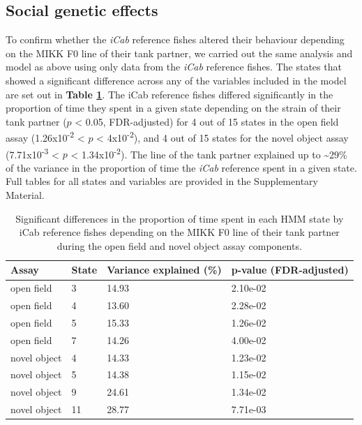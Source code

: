 \documentclass[
]{book}
\begin{document}
\hypertarget{social-genetic-effects-2}{%
\subsection{Social genetic effects}\label{social-genetic-effects-2}}

To confirm whether the \emph{\textcolor{iCab_424B4D}{iCab}} reference fishes altered their behaviour depending on the MIKK F0 line of their tank partner, we carried out the same analysis and model as above using only data from the \emph{\textcolor{iCab_424B4D}{iCab}} reference fishes. The states that showed a significant difference across any of the variables included in the model are set out in \textbf{Table \ref{tab:mikk-sge-F0}}. The iCab reference fishes differed significantly in the proportion of time they spent in a given state depending on the strain of their tank partner (\(p\) \textless{} 0.05, FDR-adjusted) for 4 out of 15 states in the open field assay (1.26x10\textsuperscript{-2} \textless{} \(p\) \textless{} 4x10\textsuperscript{-2}), and 4 out of 15 states for the novel object assay (7.71x10\textsuperscript{-3} \textless{} \(p\) \textless{} 1.34x10\textsuperscript{-2}). The line of the tank partner explained up to \textasciitilde29\% of the variance in the proportion of time the \emph{\textcolor{iCab_424B4D}{iCab}} reference spent in a given state. Full tables for all states and variables are provided in the Supplementary Material.

\begin{table}

\caption{\label{tab:mikk-sge-F0}Significant differences in the proportion of time spent in each HMM state by iCab reference fishes depending on the MIKK F0 line of their tank partner during the open field and novel object assay components.}
\centering
\begin{tabular}[t]{l|l|l|l}
\hline
Assay & State & Variance explained (\%) & p-value (FDR-adjusted)\\
\hline
open field & 3 & 14.93 & 2.10e-02\\
\hline
open field & 4 & 13.60 & 2.28e-02\\
\hline
open field & 5 & 15.33 & 1.26e-02\\
\hline
open field & 7 & 14.26 & 4.00e-02\\
\hline
novel object & 4 & 14.33 & 1.23e-02\\
\hline
novel object & 5 & 14.38 & 1.15e-02\\
\hline
novel object & 9 & 24.61 & 1.34e-02\\
\hline
novel object & 11 & 28.77 & 7.71e-03\\
\hline
\end{tabular}
\end{table}
\end{document}
